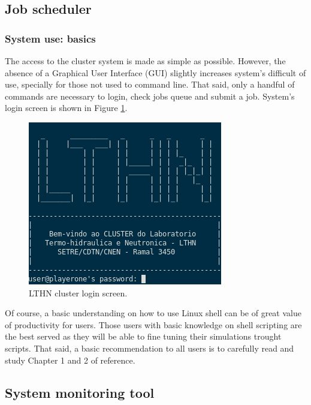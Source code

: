 \documentclass[twoside,a4paper,12pt,english]{inac19}
\begin{document}
\subsection{Job scheduler}
\label{ssec:slurm}



\subsubsection{System use: basics}
The access to the cluster system is made as simple as possible. However, the absence of a Graphical User Interface
(GUI) slightly increases system's difficult of use, specially for those not used to command line. That said, only
a handful of commands are necessary to login, check jobs queue and submit a job. System's login screen is shown
in Figure \ref{fig:login-screen}.

\begin{figure}[h] %
  \centering\includegraphics[scale=0.7]{images/p1login.png}
  \caption{LTHN cluster login screen.}
  \label{fig:login-screen}
\end{figure}

Of course, a basic understanding on how to use Linux shell can be of great value of productivity for users.
Those users with basic knowledge on shell scripting are the best served as they will be able to fine tuning
their simulations trought scripts. That said, a basic recommendation to all users is to carefully read and
study Chapter 1 and 2 of reference\cite{ECP}.

\subsection{System monitoring tool}
\label{ssec:ganglia}
\end{document}
